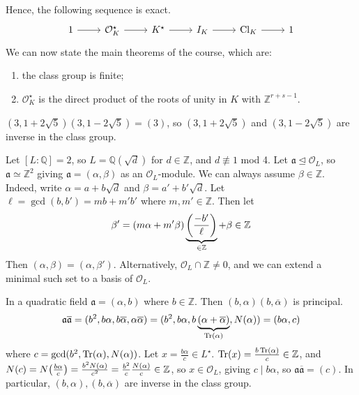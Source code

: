 Hence, the following sequence is exact.
\[\begin{tikzcd}
	1 & {\mathcal O_K^\star} & {K^\star} & {I_K} & {\mathrm{Cl}_K} & 1
	\arrow[from=1-1, to=1-2]
	\arrow[from=1-2, to=1-3]
	\arrow[from=1-3, to=1-4]
	\arrow[from=1-4, to=1-5]
	\arrow[from=1-5, to=1-6]
\end{tikzcd}\]
We can now state the main theorems of the course, which are:
\begin{enumerate}
    \item the class group is finite;
    \item \( \mathcal O_K^\star \) is the direct product of the roots of unity in \( K \) with \( \mathbb Z^{r+s-1} \).
\end{enumerate}
\begin{example}
    \( (3,1+2\sqrt{5})(3,1-2\sqrt{5}) = (3) \), so \( (3,1+2\sqrt{5}) \) and \( (3,1-2\sqrt{5}) \) are inverse in the class group.
\end{example}
\begin{example}
   Let  \( [L:\mathbb Q] = 2 \), so \( L = \mathbb Q(\sqrt{d}) \) for \( d \in \mathbb Z \), and \( d \not\equiv 1 \) mod 4.
   Let \( \mathfrak a \trianglelefteq \mathcal O_L \), so \( \mathfrak a \simeq \mathbb Z^2 \) giving \( \mathfrak a = (\alpha, \beta) \) as an \( \mathcal O_L \)-module.
   We can always assume \( \beta \in \mathbb Z \).
   Indeed, write \( \alpha = a + b \sqrt{d} \) and \( \beta = a' + b' \sqrt{d} \).
   Let \( \ell = \gcd(b, b') = mb + m'b' \) where \( m, m' \in \mathbb Z \).
   Then let
   \[ \beta' = (m\alpha + m'\beta) \underbrace{\qty(\frac{-b'}{\ell})}_{\in \mathbb Z} + \beta \in \mathbb Z \]
   Then \( (\alpha, \beta) = (\alpha, \beta') \).
    Alternatively, \( \mathcal O_L \cap \mathbb Z \neq \qty{0} \), and we can extend a minimal such set to a basis of \( \mathcal O_L \).
\end{example}
\begin{example}
    In a quadratic field \( \mathfrak a = (\alpha, b) \) where \( b \in \mathbb Z \).
    Then \( (b, \alpha) (b, \overline \alpha) \) is principal.
    \[ \mathfrak a \overline{\mathfrak a} = (b^2, b\alpha, b\overline \alpha, \alpha\overline\alpha) = (b^2, b\alpha, b\underbrace{(\alpha + \overline \alpha)}_{\Tr(\alpha)}, N(\alpha)) = (b\alpha, c) \]
    where \( c = \gcd(b^2, \Tr(\alpha), N(\alpha)) \).
    Let \( x = \frac{b\alpha}{c} \in L^\star \).
    \( \Tr(x) = \frac{b\Tr(\alpha)}{c} \in \mathbb Z \), and \( N(c) = N\qty(\frac{b\alpha}{c}) = \frac{b^2 N(\alpha)}{c^2} = \frac{b^2}{c} \frac{N(\alpha)}{c} \in \mathbb Z \), so \( x \in \mathcal O_L \), giving \( c \mid b\alpha \), so \( \mathfrak a \overline{\mathfrak a} = (c) \).
    In particular, \( (b, \alpha), (b, \overline \alpha) \) are inverse in the class group.
\end{example}

